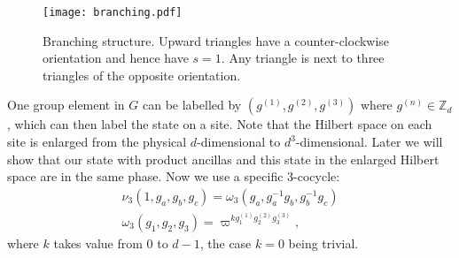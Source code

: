 \documentclass[aps,amsfonts,pra,twocolumn,showpacs]{revtex4-1}
\newcommand{\be}{\begin{equation}}
\newcommand{\ee}{\end{equation}}
\newcommand{\zd}{\mathbb{Z}_d}
\begin{document}
\begin{figure}[h]
	\centering
	\texttt{[image: branching.pdf]}
	\caption{Branching structure. Upward triangles have a counter-clockwise orientation and hence have $s=1$. Any triangle is next to three triangles of the opposite orientation.} \label{branching}
\end{figure}

One group element in $G$ can be labelled by $(g^{(1)}, g^{(2)}, g^{(3)})$ where $g^{(n)} \in \zd$, which can then label the state on a site. Note that the Hilbert space on each site is enlarged from the physical $d$-dimensional to $d^3$-dimensional. Later we will show that our state with product ancillas and this state in the enlarged Hilbert space are in the same phase. Now we use a specific 3-cocycle:
	\begin{align}
	\nu_3 (1, g_a, g_b, g_c) = \omega_3 (g_a, g_a^{-1}g_b, g_b^{-1}g_c) \\
	\omega_3 (g_1, g_2, g_3) = \varpi^{k g_1^{(1)} g_2^{(2)} g_3^{(3)}},
	\end{align}
where $k$ takes value from 0 to $d-1$, the case $k=0$ being trivial.

\end{document}
